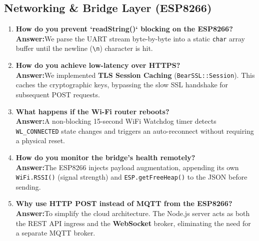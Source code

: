 \documentclass[12pt,a4paper]{article}
\newcommand{\keyword}[1]{\textcolor{keywordcolor}{\textbf{#1}}}
\newcommand{\Q}[1]{\textcolor{questioncolor}{\textbf{#1}}}
\newcommand{\A}{\textcolor{answercolor}{\textbf{Answer:}}}
\begin{document}
\subsection*{Networking \& Bridge Layer (ESP8266)}
\begin{enumerate}[resume]
    \item \Q{How do you prevent `readString()` blocking on the ESP8266?} \\ \A We parse the UART stream byte-by-byte into a static \texttt{char} array buffer until the newline (\texttt{\textbackslash n}) character is hit.
    \item \Q{How do you achieve low-latency over HTTPS?} \\ \A We implemented \keyword{TLS Session Caching} (\texttt{BearSSL::Session}). This caches the cryptographic keys, bypassing the slow SSL handshake for subsequent POST requests.
    \item \Q{What happens if the Wi-Fi router reboots?} \\ \A A non-blocking 15-second WiFi Watchdog timer detects \texttt{WL\_CONNECTED} state changes and triggers an auto-reconnect without requiring a physical reset.
    \item \Q{How do you monitor the bridge's health remotely?} \\ \A The ESP8266 injects payload augmentation, appending its own \texttt{WiFi.RSSI()} (signal strength) and \texttt{ESP.getFreeHeap()} to the JSON before sending.
    \item \Q{Why use HTTP POST instead of MQTT from the ESP8266?} \\ \A To simplify the cloud architecture. The Node.js server acts as both the REST API ingress and the \keyword{WebSocket} broker, eliminating the need for a separate MQTT broker.
\end{enumerate}
\end{document}
